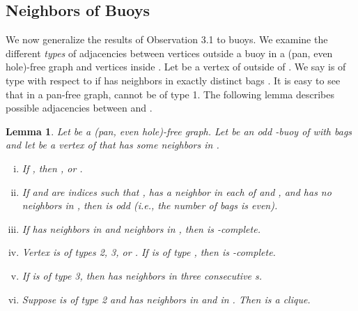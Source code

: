 \documentclass[11pt,a4paper]{article}
\newtheorem{lemma}[theorem]{Lemma}
\begin{document}
\subsection{Neighbors of Buoys}
\label{sec:buoy-neighbor}
We now generalize the results of Observation 3.1 to buoys. We
examine the different \emph{types} of adjacencies between vertices
outside a buoy  in a (pan, even hole)-free graph and vertices
inside . Let  be a vertex of  outside of . We say 
is of type  with respect to  if  has neighbors in exactly
 distinct bags . It is easy to see that in a pan-free
graph,  cannot be of type 1. The following lemma describes
possible adjacencies between  and .
\begin{lemma}\label{lem:buoy-outside}
Let  be a (pan, even hole)-free graph. Let  be an odd -buoy
of  with bags  and let  be a vertex of  that has some neighbors in
.

\begin{enumerate}[(i)]
\item If , then , or  .
\item If  and  are indices such that   ,  has a neighbor in each of  and , and 
has no neighbors in   , then
 is odd (i.e., the number of bags  is
even).
\item If  has neighbors in  and neighbors in
, then  is -complete.
\item Vertex  is of types 2, 3, or . If  is of type
, then  is -complete.
\item If  is of type 3, then  has neighbors in three
consecutive s.
\item Suppose  is of type 2 and has neighbors in  and in
. Then  is a clique.
\end{enumerate}
\end{lemma}
\end{document}
